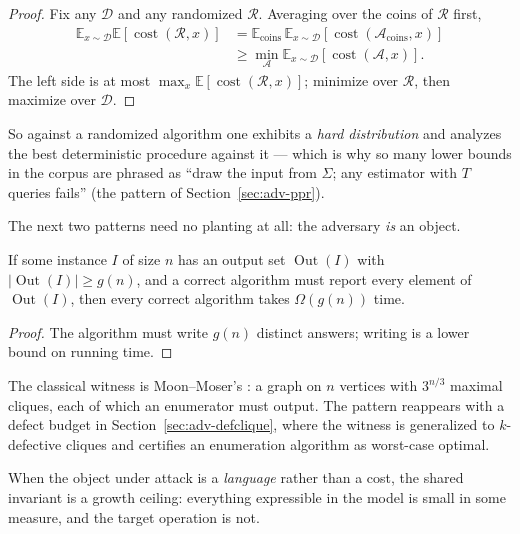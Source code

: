 \begin{proof}
Fix any $\mathcal{D}$ and any randomized $\mathcal{R}$. Averaging over the coins of
$\mathcal{R}$ first,
\begin{align*}
\mathbb{E}_{x\sim\mathcal{D}}\mathbb{E}[\operatorname{cost}(\mathcal{R},x)]
&= \mathbb{E}_{\text{coins}}\,\mathbb{E}_{x\sim\mathcal{D}}
[\operatorname{cost}(\mathcal{A}_{\text{coins}},x)]\\
&\ge \min_{\mathcal{A}} \mathbb{E}_{x\sim\mathcal{D}}[\operatorname{cost}(\mathcal{A},x)].
\end{align*}
The left side is at most $\max_x \mathbb{E}[\operatorname{cost}(\mathcal{R},x)]$; minimize over
$\mathcal{R}$, then maximize over $\mathcal{D}$.
\end{proof}

So against a randomized algorithm one exhibits a \emph{hard distribution} and analyzes the best
deterministic procedure against it --- which is why so many lower bounds in the corpus are
phrased as ``draw the input from $\Sigma$; any estimator with $T$ queries fails'' (the pattern
of Section~\ref{sec:adv-ppr}).

The next two patterns need no planting at all: the adversary \emph{is} an object.

\begin{proposition}\label{prop:adv-output}
If some instance $I$ of size $n$ has an output set $\operatorname{Out}(I)$ with
$|\operatorname{Out}(I)| \ge g(n)$, and a correct algorithm must report every element of
$\operatorname{Out}(I)$, then every correct algorithm takes $\Omega(g(n))$ time. \eop
\end{proposition}

\begin{proof}
The algorithm must write $g(n)$ distinct answers; writing is a lower bound on running time.
\end{proof}

The classical witness is Moon--Moser's \citep{adversarial-construction-bg4}: a graph on $n$
vertices with $3^{n/3}$ maximal cliques, each of which an enumerator must output. The pattern
reappears with a defect budget in Section~\ref{sec:adv-defclique}, where the witness is
generalized to $k$-defective cliques and certifies an enumeration algorithm as worst-case
optimal.

When the object under attack is a \emph{language} rather than a cost, the shared invariant is a
growth ceiling: everything expressible in the model is small in some measure, and the target
operation is not.

